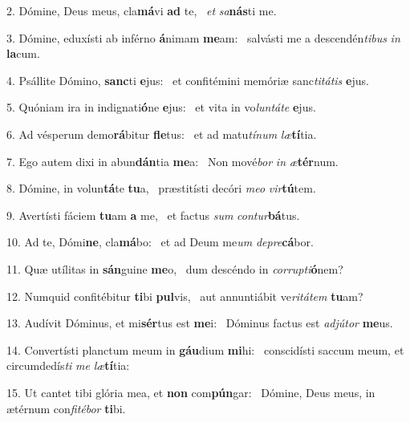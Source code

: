 2. Dómine, Deus meus, cla\textbf{má}vi \textbf{ad} te, \ast\  \textit{et} \textit{sa}\textbf{nás}ti me.\

3. Dómine, eduxísti ab inférno \textbf{á}nimam \textbf{me}am: \ast\  salvásti me a descendén\textit{ti}\textit{bus} \textit{in} \textbf{la}cum.\

4. Psállite Dómino, \textbf{sanc}ti \textbf{e}jus: \ast\  et confitémini memóriæ sanc\textit{ti}\textit{tá}\textit{tis} \textbf{e}jus.\

5. Quóniam ira in indignati\textbf{ó}ne \textbf{e}jus: \ast\  et vita in vo\textit{lun}\textit{tá}\textit{te} \textbf{e}jus.\

6. Ad vésperum demo\textbf{rá}bitur \textbf{fle}tus: \ast\  et ad matu\textit{tí}\textit{num} \textit{læ}\textbf{tí}tia.\

7. Ego autem dixi in abun\textbf{dán}tia \textbf{me}a: \ast\  Non mové\textit{bor} \textit{in} \textit{æ}\textbf{tér}num.\

8. Dómine, in volun\textbf{tá}te \textbf{tu}a, \ast\  præstitísti decóri \textit{me}\textit{o} \textit{vir}\textbf{tú}tem.\

9. Avertísti fáciem \textbf{tu}am \textbf{a} me, \ast\  et factus \textit{sum} \textit{con}\textit{tur}\textbf{bá}tus.\

10. Ad te, Dómi\textbf{ne}, cla\textbf{má}bo: \ast\  et ad Deum me\textit{um} \textit{de}\textit{pre}\textbf{cá}bor.\

11. Quæ utílitas in \textbf{sán}guine \textbf{me}o, \ast\  dum descéndo in \textit{cor}\textit{rup}\textit{ti}\textbf{ó}nem?\

12. Numquid confitébitur \textbf{ti}bi \textbf{pul}vis, \ast\  aut annuntiábit ve\textit{ri}\textit{tá}\textit{tem} \textbf{tu}am?\

13. Audívit Dóminus, et mi\textbf{sér}tus est \textbf{me}i: \ast\  Dóminus factus est \textit{ad}\textit{jú}\textit{tor} \textbf{me}us.\

14. Convertísti planctum meum in \textbf{gáu}dium \textbf{mi}hi: \ast\  conscidísti saccum meum, et circumdedís\textit{ti} \textit{me} \textit{læ}\textbf{tí}tia:\

15. Ut cantet tibi glória mea, et \textbf{non} com\textbf{pún}gar: \ast\  Dómine, Deus meus, in ætérnum con\textit{fi}\textit{té}\textit{bor} \textbf{ti}bi.\

